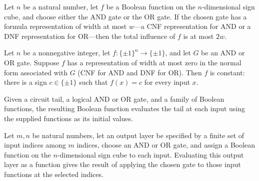 \begin{theorem}
\label{FABL.totalInfluence_le_two_mul_of_hasWidthLE}
\leanok
{}
Let $n$ be a natural number, let $f$ be a Boolean function on the $n$-dimensional sign
cube, and choose either the AND gate or the OR gate. If the chosen gate has a formula
representation of width at most $w$—a CNF representation for AND or a DNF representation
for OR—then the total influence of $f$ is at most $2w$.
\end{theorem}

\begin{theorem}
\label{FABL.CircuitGate.exists_eq_const_of_hasWidthLE_zero}
\leanok
{}
Let $n$ be a nonnegative integer, let $f:\{\pm1\}^n\to\{\pm1\}$, and let $G$ be an AND
or OR gate. Suppose $f$ has a representation of width at most zero in the normal form
associated with $G$ (CNF for AND and DNF for OR). Then $f$ is constant: there is a sign
$c\in\{\pm1\}$ such that $f(x)=c$ for every input $x$.
\end{theorem}

\begin{definition}
\label{FABL.CircuitTail.evalFunction}
\leanok
{}
Given a circuit tail, a logical AND or OR gate, and a family of Boolean functions, the
resulting Boolean function evaluates the tail at each input using the supplied functions
as its initial values.
\end{definition}

\begin{theorem}
\label{FABL.CircuitTail.evalFunction_output}
\leanok
{}
Let $m,n$ be natural numbers, let an output layer be specified by a finite set of input
indices among $m$ indices, choose an AND or OR gate, and assign a Boolean function on
the $n$-dimensional sign cube to each input. Evaluating this output layer as a function
gives the result of applying the chosen gate to those input functions at the selected
indices.
\end{theorem}

